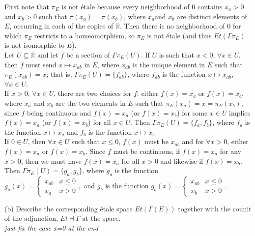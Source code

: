First note that $\pi_E$ is not \'etale because every neighborhood of $0$ contains $x_a > 0$ and $x_b > 0$ such that $\pi(x_a) = \pi(x_b)$, where $x_a$and $x_b$ are distinct elements of $E$, occurring in each of the copies of $\mathbb{R}$. Then there is no neighborhood of $0$ for which $\pi_E$ restricts to a  homeomorphism, so $\pi_E$ is not \'etale (and thus $Et(\Gamma \pi_E)$ is not isomorphic to $E$).\\

Let $U \subseteq \mathbb{R}$ and let $f$ be a section of $\Gamma \pi_E(U)$. If $U$ is such that $x < 0$, $\forall x \in U$, then $f$ must send $x \mapsto x_{ab}$ in $E$, where $x_{ab}$ is the unique element in $E$ such that $\pi_E(x_{ab})=x$; that is, $\Gamma\pi_E(U) = \{f_{ab}\}$, where $f_{ab}$ is the function $x \mapsto x_{ab}$, $\forall x \in U$.\\

If $x >0$, $\forall x \in U$, there are two choices for $f$: either $f(x) = x_a$ or $f(x)=x_b$, where $x_a$ and $x_b$ are the two elements in $E$ such that $\pi_E(x_a)=x=\pi_E(x_b)$, since $f$ being continuous and $f(x)=x_a$ (or $f(x)=x_b$) for some $x \in U$ implies $f(x)=x_a$ (or $f(x)=x_b$) for all $x \in U$. Then  $\Gamma\pi_E(U) = \{f_a,f_b\}$, where $f_a$ is the function $x \mapsto x_a$ and $f_b$ is the function $x \mapsto x_b$ \\

If $0 \in U$, then $\forall x \in U$ such that $x \leq 0$, $f(x)$ must be $x_{ab}$ and for $\forall x>0$, either $f(x)=x_a$ or $f(x)=x_b$. Since $f$ must be continuous, if $f(x)=x_a$ for any $x>0$, then we must have $f(x)=x_a$ for all $x >0$ and likewise if $f(x)=x_b$. Then $\Gamma\pi_E(U)=\{g_a,g_b\}$, where $g_a$ is the function \\
$g_a(x) = \begin{cases}
x_{ab} & x \leq 0\\
x_a &  x >0
\end{cases},
$ and $g_b$ is the function
$g_b(x) = \begin{cases}
x_{ab} & x \leq 0\\
x_b &  x >0
\end{cases}.
$

(b) Describe the corresponding \'etale space $Et(\Gamma (E))$ together with the counit of the adjunction, $Et \dashv \Gamma $ at the space.\\

\textit{just fix the case x=0 at the end}\\

